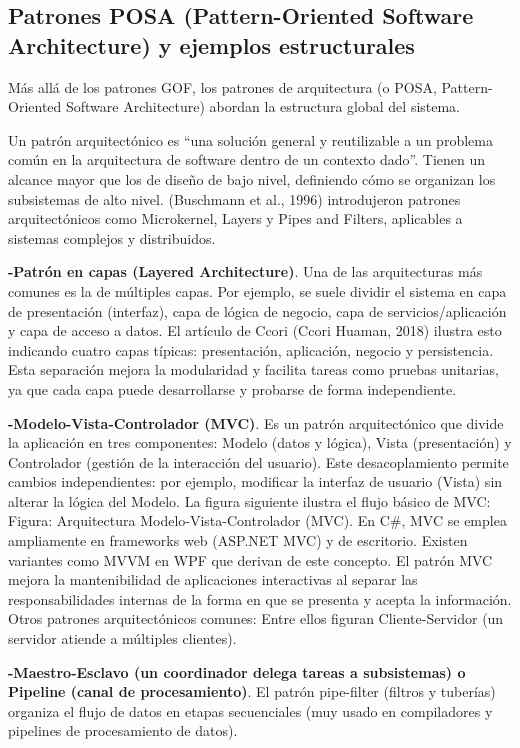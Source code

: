 \documentclass[
  11pt,
  letterpaper,
]{article}
\begin{document}
\subsection{Patrones POSA (Pattern-Oriented Software Architecture) y
ejemplos
estructurales}\label{patrones-posa-pattern-oriented-software-architecture-y-ejemplos-estructurales}

Más allá de los patrones GOF, los patrones de arquitectura (o POSA,
Pattern-Oriented Software Architecture) abordan la estructura global del
sistema.

Un patrón arquitectónico es ``una solución general y reutilizable a un
problema común en la arquitectura de software dentro de un contexto
dado''. Tienen un alcance mayor que los de diseño de bajo nivel,
definiendo cómo se organizan los subsistemas de alto nivel. (Buschmann
et al., 1996) introdujeron patrones arquitectónicos como Microkernel,
Layers y Pipes and Filters, aplicables a sistemas complejos y
distribuidos.

\textbf{-Patrón en capas (Layered Architecture)}. Una de las
arquitecturas más comunes es la de múltiples capas. Por ejemplo, se
suele dividir el sistema en capa de presentación (interfaz), capa de
lógica de negocio, capa de servicios/aplicación y capa de acceso a
datos. El artículo de Ccori (Ccori Huaman, 2018) ilustra esto indicando
cuatro capas típicas: presentación, aplicación, negocio y persistencia.
Esta separación mejora la modularidad y facilita tareas como pruebas
unitarias, ya que cada capa puede desarrollarse y probarse de forma
independiente.

\textbf{-Modelo-Vista-Controlador (MVC)}. Es un patrón arquitectónico
que divide la aplicación en tres componentes: Modelo (datos y lógica),
Vista (presentación) y Controlador (gestión de la interacción del
usuario). Este desacoplamiento permite cambios independientes: por
ejemplo, modificar la interfaz de usuario (Vista) sin alterar la lógica
del Modelo. La figura siguiente ilustra el flujo básico de MVC: Figura:
Arquitectura Modelo-Vista-Controlador (MVC). En C\#, MVC se emplea
ampliamente en frameworks web (ASP.NET MVC) y de escritorio. Existen
variantes como MVVM en WPF que derivan de este concepto. El patrón MVC
mejora la mantenibilidad de aplicaciones interactivas al separar las
responsabilidades internas de la forma en que se presenta y acepta la
información. Otros patrones arquitectónicos comunes: Entre ellos figuran
Cliente-Servidor (un servidor atiende a múltiples clientes).

\textbf{-Maestro-Esclavo (un coordinador delega tareas a subsistemas) o
Pipeline (canal de procesamiento)}. El patrón pipe-filter (filtros y
tuberías) organiza el flujo de datos en etapas secuenciales (muy usado
en compiladores y pipelines de procesamiento de datos).
\end{document}
